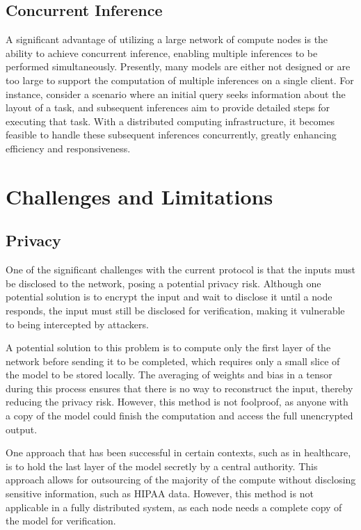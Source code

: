 \documentclass{article}
\begin{document}
\subsection{Concurrent Inference}
A significant advantage of utilizing a large network of compute nodes is the ability to achieve concurrent inference, enabling multiple inferences to be performed simultaneously. 
Presently, many models are either not designed or are too large to support the computation of multiple inferences on a single client. 
For instance, consider a scenario where an initial query seeks information about the layout of a task, and subsequent inferences aim to provide detailed steps for executing that task. 
With a distributed computing infrastructure, it becomes feasible to handle these subsequent inferences concurrently, greatly enhancing efficiency and responsiveness.

\section{Challenges and Limitations}
\subsection{Privacy}
One of the significant challenges with the current protocol is that the inputs must be disclosed to the network, posing a potential privacy risk. 
Although one potential solution is to encrypt the input and wait to disclose it until a node responds, the input must still be disclosed for verification, making it vulnerable to being intercepted by attackers.

A potential solution to this problem is to compute only the first layer of the network before sending it to be completed, which requires only a small slice of the model to be stored locally. 
The averaging of weights and bias in a tensor during this process ensures that there is no way to reconstruct the input, thereby reducing the privacy risk. 
However, this method is not foolproof, as anyone with a copy of the model could finish the computation and access the full unencrypted output.

One approach that has been successful in certain contexts, such as in healthcare, is to hold the last layer of the model secretly by a central authority. 
This approach allows for outsourcing of the majority of the compute without disclosing sensitive information, such as HIPAA data. 
However, this method is not applicable in a fully distributed system, as each node needs a complete copy of the model for verification.
\end{document}
